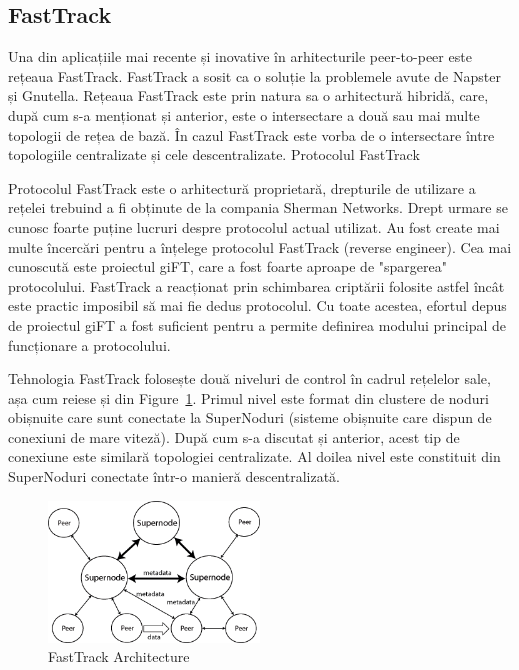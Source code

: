 \subsection{FastTrack}

Una din aplicațiile mai recente și inovative în arhitecturile peer-to-peer
este rețeaua FastTrack. FastTrack a sosit ca o soluție la problemele avute de
Napster și Gnutella. Rețeaua FastTrack este prin natura sa o arhitectură
hibridă, care, după cum s-a menționat și anterior, este o intersectare a două
sau mai multe topologii de rețea de bază. În cazul FastTrack este vorba de o
intersectare între topologiile centralizate și cele descentralizate.
Protocolul FastTrack

Protocolul FastTrack este o arhitectură proprietară, drepturile de utilizare a
rețelei trebuind a fi obținute de la compania Sherman Networks. Drept urmare
se cunosc foarte puține lucruri despre protocolul actual utilizat. Au fost
create mai multe încercări pentru a înțelege protocolul FastTrack (reverse
engineer). Cea mai cunoscută este proiectul giFT, care a fost foarte aproape
de "spargerea" protocolului. FastTrack a reacționat prin schimbarea criptării
folosite astfel încât este practic imposibil să mai fie dedus protocolul. Cu
toate acestea, efortul depus de proiectul giFT a fost suficient pentru a
permite definirea modului principal de funcționare a protocolului.

Tehnologia FastTrack folosește două niveluri de control în cadrul rețelelor
sale, așa cum reiese și din Figure~\ref{fig:p2p-systems:fasttrack}. Primul
nivel este format din clustere de noduri obișnuite care sunt conectate la
SuperNoduri (sisteme obișnuite care dispun de conexiuni de mare viteză). După
cum s-a discutat și anterior, acest tip de conexiune este similară topologiei
centralizate. Al doilea nivel este constituit din SuperNoduri conectate într-o
manieră descentralizată.

\begin{figure}
  \centering
  \includegraphics[width=0.5\textwidth]{src/img/p2p-systems/fasttrack}
  \caption{FastTrack Architecture}
  \label{fig:p2p-systems:fasttrack}
\end{figure}


